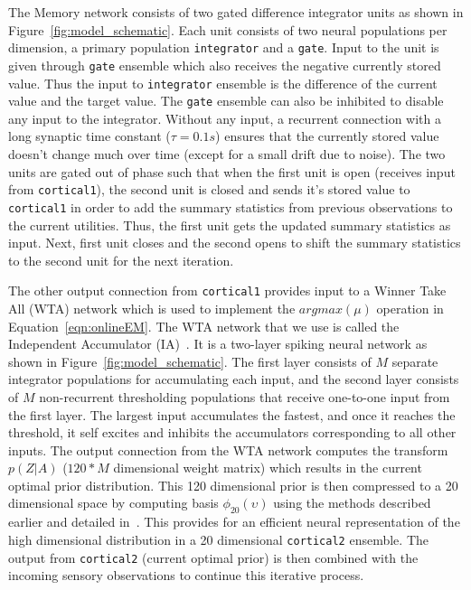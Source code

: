\documentclass[10pt,letterpaper]{article}
\begin{document}
The Memory network consists of two gated difference integrator units as shown in Figure~\ref{fig:model_schematic}. Each unit consists of two neural populations per dimension, a primary population \texttt{integrator} and a \texttt{gate}. Input to the unit is given through \texttt{gate} ensemble which also receives the negative currently stored value. Thus the input to \texttt{integrator} ensemble is the difference of the current value and the target value. The \texttt{gate} ensemble can also be inhibited to disable any input to the integrator. Without any input, a recurrent connection with a long synaptic time constant ($\tau = 0.1s$) ensures that the currently stored value doesn't change much over time (except for a small drift due to noise). The two units are gated out of phase such that when the first unit is open (receives input from \texttt{cortical1}), the second unit is closed and sends it's stored value to \texttt{cortical1} in order to add the summary statistics from previous observations to the current utilities. Thus, the first unit gets the updated summary statistics as input. Next, first unit closes and the second opens to shift the summary statistics to the second unit for the next iteration.


The other output connection from \texttt{cortical1} provides input to a Winner Take All (WTA) network which is used to implement the $argmax(\mu)$ operation in Equation~\ref{eqn:onlineEM}. The WTA network that we use is called the Independent Accumulator (IA)~\cite{gosmann2017a}. It is a two-layer spiking neural network as shown in Figure~\ref{fig:model_schematic}. The first layer consists of $M$ separate integrator populations for accumulating each input, and the second layer consists of $M$ non-recurrent thresholding populations that receive one-to-one input from the first layer. The largest input accumulates the fastest, and once it reaches the threshold, it self excites and inhibits the accumulators corresponding to all other inputs. The output connection from the WTA network computes the transform $p(Z | A)$ ($120 * M$ dimensional weight matrix) which results in the current optimal prior distribution. This 120 dimensional prior is then compressed to a 20 dimensional space by computing basis $\phi_{20}(\upsilon)$ using the methods described earlier and detailed in~\cite{sharma2017}. This provides for an efficient neural representation of the high dimensional distribution in a 20 dimensional \texttt{cortical2} ensemble. The output from \texttt{cortical2} (current optimal prior) is then combined with the incoming sensory observations to continue this iterative process. 
\end{document}

